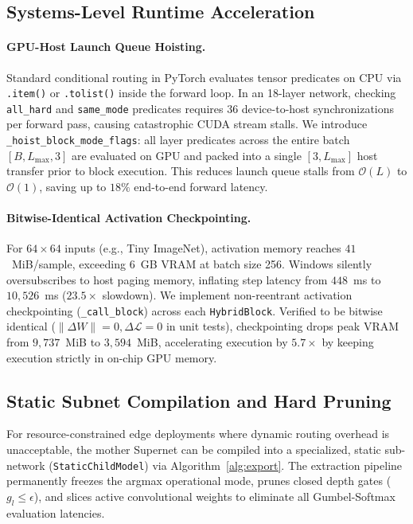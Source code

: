\documentclass[11pt, a4paper]{article}
\begin{document}
\subsection{Systems-Level Runtime Acceleration}

\paragraph{GPU-Host Launch Queue Hoisting.}
Standard conditional routing in PyTorch evaluates tensor predicates on CPU via \texttt{.item()} or \texttt{.tolist()} inside the forward loop. In an 18-layer network, checking \texttt{all\_hard} and \texttt{same\_mode} predicates requires 36 device-to-host synchronizations per forward pass, causing catastrophic CUDA stream stalls. We introduce \texttt{\_hoist\_}\allowbreak\texttt{block\_}\allowbreak\texttt{mode\_flags}: all layer predicates across the entire batch $[B, L_{\max}, 3]$ are evaluated on GPU and packed into a single $[3, L_{\max}]$ host transfer prior to block execution. This reduces launch queue stalls from $\mathcal{O}(L)$ to $\mathcal{O}(1)$, saving up to $18\%$ end-to-end forward latency.

\paragraph{Bitwise-Identical Activation Checkpointing.}
For $64 \times 64$ inputs (e.g., Tiny ImageNet), activation memory reaches $41$~MiB/sample, exceeding 6~GB VRAM at batch size 256. Windows silently oversubscribes to host paging memory, inflating step latency from $448$~ms to $10{,}526$~ms ($23.5\times$ slowdown). We implement non-reentrant activation checkpointing (\texttt{\_call\_block}) across each \texttt{HybridBlock}. Verified to be bitwise identical ($\|\Delta W\| = 0, \Delta \mathcal{L} = 0$ in unit tests), checkpointing drops peak VRAM from $9{,}737$~MiB to $3{,}594$~MiB, accelerating execution by $5.7\times$ by keeping execution strictly in on-chip GPU memory.

\subsection{Static Subnet Compilation and Hard Pruning}
\label{sec:static_export}

For resource-constrained edge deployments where dynamic routing overhead is unacceptable, the mother Supernet can be compiled into a specialized, static sub-network (\texttt{StaticChildModel}) via Algorithm~\ref{alg:export}. The extraction pipeline permanently freezes the argmax operational mode, prunes closed depth gates ($g_l \le \epsilon$), and slices active convolutional weights to eliminate all Gumbel-Softmax evaluation latencies.
\end{document}
